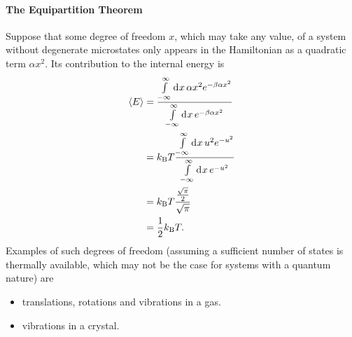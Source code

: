 \paragraph{The Equipartition Theorem}
Suppose that some degree of freedom $x$, which may take any value, of a system without degenerate microstates only appears in the Hamiltonian as a quadratic term $\alpha x^{2}$. Its contribution to the internal energy is
\begin{align*}
	\expval{E} &= \frac{\int\limits_{-\infty}^{\infty}\dd[]{x}\alpha x^{2}e^{-\beta\alpha x^{2}}}{\int\limits_{-\infty}^{\infty}\dd[]{x}e^{-\beta\alpha x^{2}}} \\
	           &= k_{\text{B}} T\frac{\int\limits_{-\infty}^{\infty}\dd[]{x}u^{2}e^{-u^{2}}}{\int\limits_{-\infty}^{\infty}\dd[]{x}e^{-u^{2}}} \\
	           &= k_{\text{B}} T\frac{\frac{\sqrt{\pi}}{2}}{\sqrt{\pi}} \\
	           &= \frac{1}{2}k_{\text{B}} T.
\end{align*}
Examples of such degrees of freedom (assuming a sufficient number of states is thermally available, which may not be the case for systems with a quantum nature) are
\begin{itemize}
	\item translations, rotations and vibrations in a gas.
	\item vibrations in a crystal.
\end{itemize}

